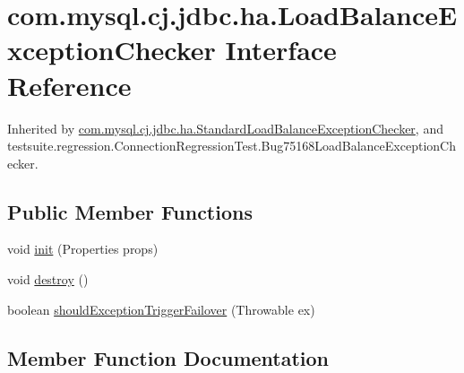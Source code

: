 \hypertarget{interfacecom_1_1mysql_1_1cj_1_1jdbc_1_1ha_1_1_load_balance_exception_checker}{}\section{com.\+mysql.\+cj.\+jdbc.\+ha.\+Load\+Balance\+Exception\+Checker Interface Reference}
\label{interfacecom_1_1mysql_1_1cj_1_1jdbc_1_1ha_1_1_load_balance_exception_checker}


Inherited by \mbox{\hyperlink{classcom_1_1mysql_1_1cj_1_1jdbc_1_1ha_1_1_standard_load_balance_exception_checker}{com.\+mysql.\+cj.\+jdbc.\+ha.\+Standard\+Load\+Balance\+Exception\+Checker}}, and testsuite.\+regression.\+Connection\+Regression\+Test.\+Bug75168\+Load\+Balance\+Exception\+Checker.

\subsection*{Public Member Functions}
\begin{DoxyCompactItemize}
\item 
void \mbox{\hyperlink{interfacecom_1_1mysql_1_1cj_1_1jdbc_1_1ha_1_1_load_balance_exception_checker_a41c1fd3f7eb7f6cd92cc174465b6574e}{init}} (Properties props)
\item 
void \mbox{\hyperlink{interfacecom_1_1mysql_1_1cj_1_1jdbc_1_1ha_1_1_load_balance_exception_checker_a6737962a26ff1f3544dfbcc20954bade}{destroy}} ()
\item 
boolean \mbox{\hyperlink{interfacecom_1_1mysql_1_1cj_1_1jdbc_1_1ha_1_1_load_balance_exception_checker_a5d8bf713d492a85c62b52278437c4e60}{should\+Exception\+Trigger\+Failover}} (Throwable ex)
\end{DoxyCompactItemize}


\subsection{Member Function Documentation}
\mbox{\label{interfacecom_1_1mysql_1_1cj_1_1jdbc_1_1ha_1_1_load_balance_exception_checker_a6737962a26ff1f3544dfbcc20954bade}} 
